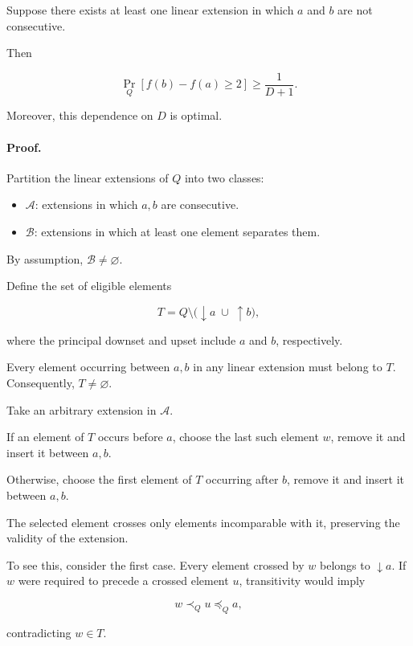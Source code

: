 \documentclass[11pt]{article}
\begin{document}
Suppose there exists at least one linear extension in which \(a\) and \(b\) are not consecutive.

Then

\[
\boxed{
\Pr_Q[f(b)-f(a)\geq2]
\geq\frac1{D+1}.
}
\]

Moreover, this dependence on \(D\) is optimal.

\paragraph{Proof.}

Partition the linear extensions of \(Q\) into two classes:

\begin{itemize}
\item \(\mathcal A\): extensions in which \(a,b\) are consecutive.
\item \(\mathcal B\): extensions in which at least one element separates them.

\end{itemize}
By assumption, \(\mathcal B\ne\varnothing\).

Define the set of eligible elements

\[
T=Q\setminus
\bigl(\downarrow a\;\cup\;\uparrow b\bigr),
\]

where the principal downset and upset include \(a\) and \(b\), respectively.

Every element occurring between \(a,b\) in any linear extension must belong to \(T\). Consequently, \(T\ne\varnothing\).

Take an arbitrary extension in \(\mathcal A\).

If an element of \(T\) occurs before \(a\), choose the last such element \(w\), remove it and insert it between \(a,b\).

Otherwise, choose the first element of \(T\) occurring after \(b\), remove it and insert it between \(a,b\).



The selected element crosses only elements incomparable with it, preserving the validity of the extension.



To see this, consider the first case. Every element crossed by \(w\) belongs to \(\downarrow a\). If \(w\) were required to precede a crossed element \(u\), transitivity would imply

\[
w\prec_Q u\preceq_Q a,
\]

contradicting \(w\in T\).
\end{document}
